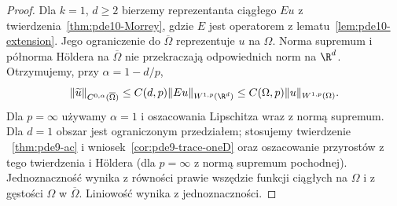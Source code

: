 \begin{proof}
Dla $k=1$, $d\ge2$ bierzemy reprezentanta ciągłego
$Eu$ z twierdzenia~\ref{thm:pde10-Morrey}, gdzie $E$
jest operatorem z lematu~\ref{lem:pde10-extension}.
Jego ograniczenie do $\overline\Omega$ reprezentuje $u$
na $\Omega$. Norma supremum i półnorma Höldera
na $\overline\Omega$ nie przekraczają odpowiednich norm
na $\R^d$. Otrzymujemy, przy $\alpha=1-d/p$,
\[
 \|\widetilde u\|_{C^{0,\alpha}(\overline\Omega)}
 \le C(d,p)\|Eu\|_{W^{1,p}(\R^d)}
 \le C(\Omega,p)\|u\|_{W^{1,p}(\Omega)}.
\]
Dla $p=\infty$ używamy $\alpha=1$ i oszacowania
Lipschitza wraz z normą supremum. Dla $d=1$ obszar
jest ograniczonym przedziałem; stosujemy twierdzenie
~\ref{thm:pde9-ac} i wniosek~\ref{cor:pde9-trace-oneD}
oraz oszacowanie przyrostów z tego twierdzenia i Höldera
(dla $p=\infty$ z normą supremum pochodnej).
Jednoznaczność wynika z równości prawie wszędzie
funkcji ciągłych na $\Omega$ i z gęstości $\Omega$
w $\overline\Omega$. Liniowość wynika z jednoznaczności.


\end{proof}
